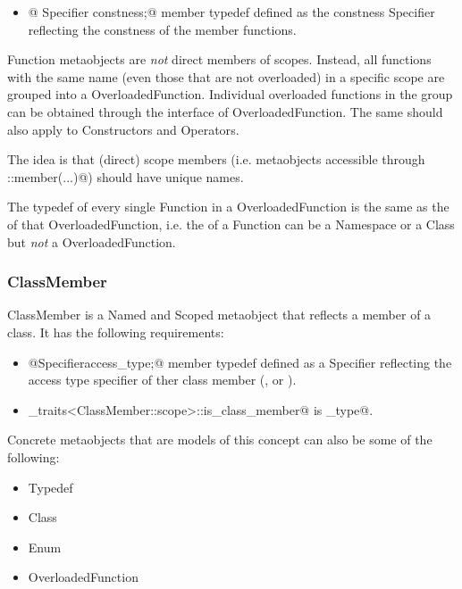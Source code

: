 \begin{itemize}
	\item{\verb@typedef @ {\metaobject Specifier} \verb@ constness;@} member typedef
	defined as the constness {\metaobject Specifier} reflecting the constness
	of the member functions.
\end{itemize}

{\metaobject Function} metaobjects are {\em not} direct members of scopes. Instead,
all functions with the same name (even those that are not overloaded) in a specific scope
are grouped into a {\metaobject OverloadedFunction}. Individual overloaded functions
in the group can be obtained through the interface of {\metaobject OverloadedFunction}.
The same should also apply to {\metaobject Constructor}s and {\metaobject Operator}s.

The idea is that (direct) scope members (i.e. metaobjects accessible through \verb@Scope::member(...)@)
should have unique names.

The \verb@scope@ typedef of every single {\metaobject Function} in a {\metaobject OverloadedFunction}
is the same as the \verb@scope@ of that {\metaobject OverloadedFunction}, i.e.
the \verb@scope@ of a {\metaobject Function} can be a {\metaobject Namespace} or a {\metaobject Class}
but {\em not} a {\metaobject OverloadedFunction}.

\subsubsection{ClassMember}

{\metaobject ClassMember} is a {\metaobject Named} and {\metaobject Scoped} metaobject
that reflects a member of a class. It has the following requirements:

\begin{itemize}
	\item{\verb@typedef @{\metaobject Specifier}\verb@ access_type;@} member typedef defined as
	a {\metaobject Specifier} reflecting the access type specifier of ther class member
	(\verb@private@, \verb@protected@ or \verb@public@).

	\item \verb@metaobject_traits<ClassMember::scope>::is_class_member@ is \verb@true_type@.
\end{itemize}

Concrete metaobjects that are models of this concept can also be some of the following:
\begin{itemize}
	\item{\metaobject Typedef}
	\item{\metaobject Class}
	\item{\metaobject Enum}
	\item{\metaobject OverloadedFunction}
\end{itemize}

